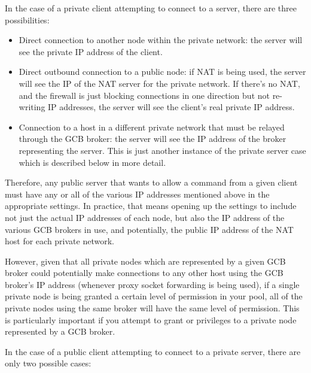 In the case of a private client attempting to connect to a server,
there are three possibilities:
\begin{itemize}

  \item Direct connection to another node within the private network:
  the server will see the private IP address of the client.

  \item Direct outbound connection to a public node: if NAT is being
  used, the server will see the IP of the NAT server for the private
  network.
  If there's no NAT, and the firewall is just blocking connections in
  one direction but not re-writing IP addresses, the server will see
  the client's real private IP address.

  \item Connection to a host in a different private network that must
  be relayed through the GCB broker: the server will see the IP
  address of the broker representing the server.
  This is just another instance of the private server case which is
  described below in more detail.

\end{itemize}

Therefore, any public server that wants to allow a command from a
given client must have any or all of the various IP addresses
mentioned above in the appropriate  settings.  In
practice, that means opening up the  settings to
include not just the actual IP addresses of each node, but also the IP
address of the various GCB brokers in use, and potentially, the public
IP address of the NAT host for each private network.

However, given that all private nodes which are represented by a
given GCB broker could potentially make connections to any other
host using the GCB broker's IP address (whenever proxy socket
forwarding is being used), if a single private node is being granted
a certain level of permission in your pool, all of the private nodes
using the same broker will have the same level of permission.
This is particularly important if you attempt to grant
 or 
privileges to a private node represented by a GCB broker.

In the case of a public client attempting to connect to a private
server, there are only two possible cases:

